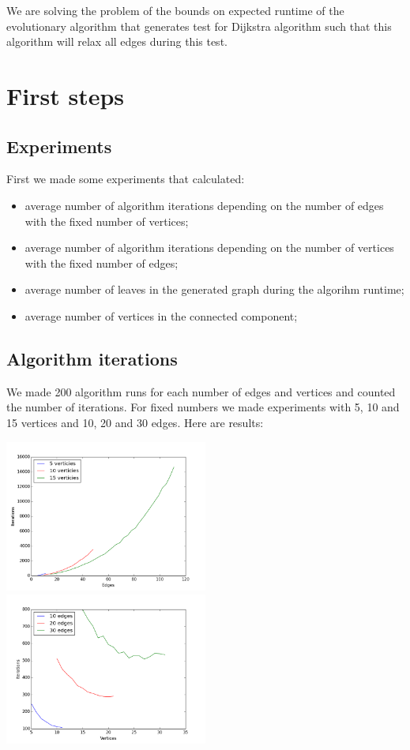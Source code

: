 \documentclass{llncs}
\begin{document}
 We are solving the problem of the bounds on expected runtime of the evolutionary algorithm that generates test for Dijkstra algorithm such that this algorithm will relax all edges during this test.
 
 \section{First steps}
 \subsection{Experiments}
 
 First we made some experiments that calculated:
 \begin{itemize}
  \item average number of algorithm iterations depending on the number of edges with the fixed number of vertices;
  \item average number of algorithm iterations depending on the number of vertices with the fixed number of edges;
  \item average number of leaves in the generated graph during the algorihm runtime;
  \item average number of vertices in the connected component;
 \end{itemize}
 
 \subsection{Algorithm iterations}
  We made 200 algorithm runs for each number of edges and vertices and counted the number of iterations. For fixed numbers we made experiments with 5, 10 and 15 vertices and 10, 20 and 30 edges. Here are results:
  
  \includegraphics[height=5cm]{pic/const_vertices.png}
  \includegraphics[height=5cm]{pic/const_edges.png}
  
\end{document}

